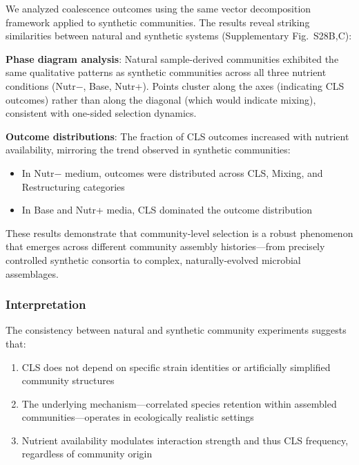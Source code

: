 We analyzed coalescence outcomes using the same vector decomposition framework applied to synthetic communities. The results reveal striking similarities between natural and synthetic systems (Supplementary Fig.~S28B,C):

\textbf{Phase diagram analysis}: Natural sample-derived communities exhibited the same qualitative patterns as synthetic communities across all three nutrient conditions (Nutr$-$, Base, Nutr+). Points cluster along the axes (indicating CLS outcomes) rather than along the diagonal (which would indicate mixing), consistent with one-sided selection dynamics.

\textbf{Outcome distributions}: The fraction of CLS outcomes increased with nutrient availability, mirroring the trend observed in synthetic communities:
\begin{itemize}
    \item In Nutr$-$ medium, outcomes were distributed across CLS, Mixing, and Restructuring categories
    \item In Base and Nutr+ media, CLS dominated the outcome distribution
\end{itemize}

These results demonstrate that community-level selection is a robust phenomenon that emerges across different community assembly histories---from precisely controlled synthetic consortia to complex, naturally-evolved microbial assemblages.

\subsubsection*{Interpretation}

The consistency between natural and synthetic community experiments suggests that:
\begin{enumerate}
    \item CLS does not depend on specific strain identities or artificially simplified community structures
    \item The underlying mechanism---correlated species retention within assembled communities---operates in ecologically realistic settings
    \item Nutrient availability modulates interaction strength and thus CLS frequency, regardless of community origin
\end{enumerate}

